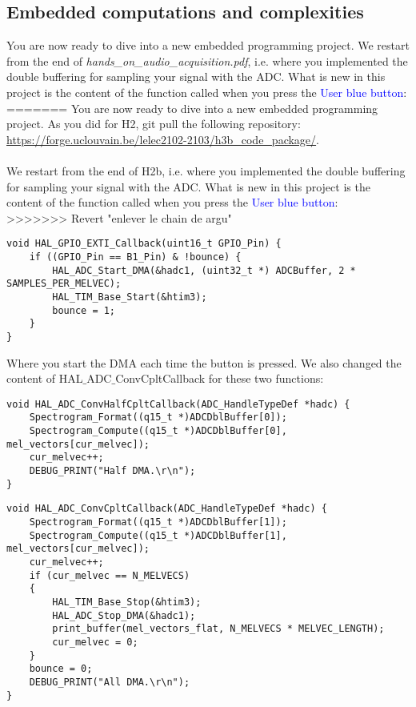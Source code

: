 \subsection{Embedded computations and complexities}
%
You are now ready to dive into a new embedded programming project. 
We restart from the end of \emph{hands\_on\_audio\_acquisition.pdf}, i.e. where you implemented the double buffering for sampling your signal with the ADC. What is new in this project is the content of the function called when you press the \textcolor{blue}{User blue button}: \\
=======
You are now ready to dive into a new embedded programming project. As you did for H2, git pull the following repository: \\
\url{https://forge.uclouvain.be/lelec2102-2103/h3b_code_package/}. \\
\\
We restart from the end of H2b, i.e. where you implemented the double buffering for sampling your signal with the ADC. What is new in this project is the content of the function called when you press the \textcolor{blue}{User blue button}: \\
>>>>>>> Revert "enlever le chain de argu"
%
\begin{lstlisting}
void HAL_GPIO_EXTI_Callback(uint16_t GPIO_Pin) {
	if ((GPIO_Pin == B1_Pin) & !bounce) {
		HAL_ADC_Start_DMA(&hadc1, (uint32_t *) ADCBuffer, 2 * SAMPLES_PER_MELVEC);
		HAL_TIM_Base_Start(&htim3);
		bounce = 1;
	}
}
\end{lstlisting}
%
Where you start the DMA each time the button is pressed. We also changed the content of \newline HAL$\_$ADC$\_$ConvCpltCallback for these two functions:
%
\begin{lstlisting}
void HAL_ADC_ConvHalfCpltCallback(ADC_HandleTypeDef *hadc) {
	Spectrogram_Format((q15_t *)ADCDblBuffer[0]);
	Spectrogram_Compute((q15_t *)ADCDblBuffer[0], mel_vectors[cur_melvec]);
	cur_melvec++;
	DEBUG_PRINT("Half DMA.\r\n");
}
\end{lstlisting}
\begin{lstlisting}
void HAL_ADC_ConvCpltCallback(ADC_HandleTypeDef *hadc) {
	Spectrogram_Format((q15_t *)ADCDblBuffer[1]);
	Spectrogram_Compute((q15_t *)ADCDblBuffer[1], mel_vectors[cur_melvec]);
	cur_melvec++;
	if (cur_melvec == N_MELVECS)
	{
		HAL_TIM_Base_Stop(&htim3);
		HAL_ADC_Stop_DMA(&hadc1);
		print_buffer(mel_vectors_flat, N_MELVECS * MELVEC_LENGTH);
		cur_melvec = 0;
	}
	bounce = 0;
	DEBUG_PRINT("All DMA.\r\n");
}
\end{lstlisting}
